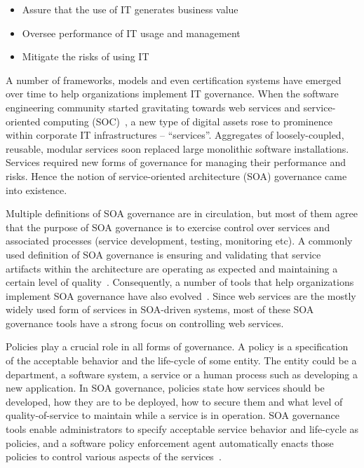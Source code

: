 \begin{itemize}
\item Assure that the use of IT generates business value
\item Oversee performance of IT usage and management
\item Mitigate the risks of using IT
\end{itemize}

A number of frameworks, models and even certification systems have emerged over time to help organizations 
implement IT governance. When the software engineering community started gravitating towards web services and
service-oriented computing (SOC)~\cite{1254461, what-is-soa}, a new type of digital assets rose to prominence within corporate IT 
infrastructures -- ``services''. Aggregates of loosely-coupled, reusable, modular services soon replaced 
large monolithic software
installations. Services required new forms of governance for managing their performance
and risks. Hence the notion of service-oriented architecture (SOA) governance came into existence. 

Multiple definitions of SOA governance
are in circulation, but most of them agree that the purpose of SOA governance is to exercise control over
services and associated processes (service development, testing, monitoring etc). A commonly used definition
of SOA governance is ensuring and validating that service artifacts within the architecture are operating
as expected and maintaining a certain level of quality~\cite{gartner-soa-gov}.
Consequently, a number of tools that help organizations implement SOA governance 
have also evolved~\cite{Schepers:2008:LAS:1363686.1363932,4730489,6478236,5577268}.
Since web services are the mostly widely used form of services in SOA-driven systems, most of these
SOA governance tools have a strong focus on controlling web services. 

Policies play a crucial role in all forms of governance. A policy is a specification of the acceptable behavior
and the life-cycle of some entity. The entity could be a department, a software system, a service or a 
human process such as developing
a new application. In SOA governance, policies state how services should be developed, how they are to be
deployed, how to secure them and what level of quality-of-service to maintain while a service is in operation.
SOA governance tools enable administrators to specify acceptable service behavior and life-cycle as policies, and
a software policy enforcement agent automatically enacts those policies to control various aspects of the 
services~\cite{5976827,4483228,4279691}. 

